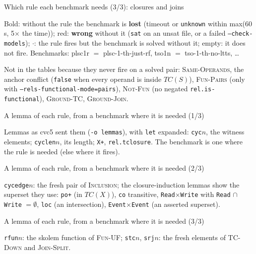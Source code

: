 \documentclass[aspectratio=169]{beamer}
\newcommand{\sm}[1]{\texttt{#1}}
\newcommand{\TC}{\mathit{TC}}
\newcommand{\rn}[1]{\textsc{#1}}
\newcommand{\bad}[1]{\textcolor{red!70!black}{#1}}
\begin{document}
\begin{frame}{Which rule each benchmark needs (3/3): closures and joins}
  \centering\tiny\setlength{\tabcolsep}{2pt}
  
  \medskip

  {\scriptsize Bold: without the rule the benchmark is \textbf{lost} (timeout or \sm{unknown} within
  max(60 s, 5$\times$ the time)); \bad{red}: \textbf{wrong} without it (\sm{sat} on an unsat file, or
  a failed \sm{--check-models}); $\cdot$: the rule fires but the benchmark is solved without it;
  empty: it does not fire. Benchmarks: plsc1r $=$ plsc-1-th-just-rf, tso1n $=$ tso-1-th-no-ltts, \dots\par}
  \medskip

  {\scriptsize Not in the tables because they never fire on a solved pair: \rn{Same-Operands}, the
  anchor conflict (\sm{false} when every operand is inside $\TC(S)$), \rn{Fun-Pairs} (only with
  \sm{--rels-functional-mode=pairs}), \rn{Not-Fun} (no negated \sm{rel.is-functional}),
  \rn{Ground-TC}, \rn{Ground-Join}.\par}
\end{frame}

\begin{frame}{A lemma of each rule, from a benchmark where it is needed (1/3)}
  \centering\tiny
  
  \medskip

  {\scriptsize Lemmas as cvc5 sent them (\sm{-o lemmas}), with \sm{let} expanded: \sm{cyc$n$}, the
  witness elements; \sm{cyclen$n$}, its length; \sm{X+}, \sm{rel.tclosure}. The benchmark is one where
  the rule is needed (else where it fires).\par}
\end{frame}

\begin{frame}{A lemma of each rule, from a benchmark where it is needed (2/3)}
  \centering\tiny
  
  \medskip

  {\scriptsize \sm{cycedge$n$}: the fresh pair of \rn{Inclusion}; the closure-induction lemmas show the
  superset they use: \sm{po+} (in $\TC(X)$), \sm{co} transitive, \sm{Read}$\times$\sm{Write} with
  \sm{Read} $\cap$ \sm{Write} $= \emptyset$, \sm{loc} (an intersection), \sm{Event}$\times$\sm{Event}
  (an asserted superset).\par}
\end{frame}

\begin{frame}{A lemma of each rule, from a benchmark where it is needed (3/3)}
  \centering\tiny
  
  \medskip

  {\scriptsize \sm{rfun$n$}: the skolem function of \rn{Fun-UF}; \sm{stc$n$}, \sm{srj$n$}: the fresh
  elements of \rn{TC-Down} and \rn{Join-Split}.\par}
\end{frame}
\end{document}
